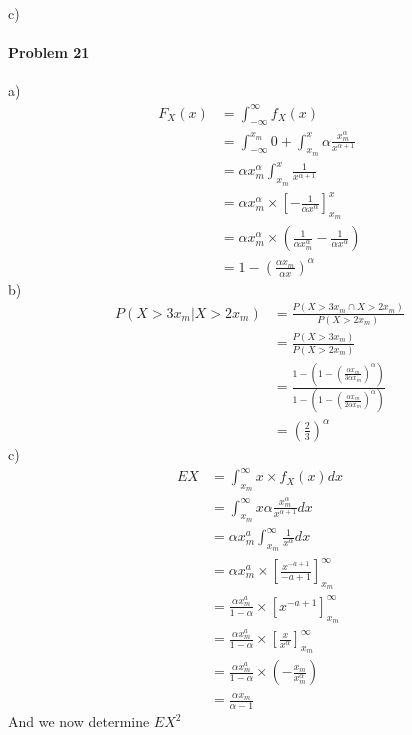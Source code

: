 c)
\paragraph{Problem 21}
a)
\begin{align*}
    F_{X}(x)&=\int_{-\infty}^{\infty}f_{X}(x) \\
         &=\int_{-\infty}^{x_{m}}0+\int_{x_{m}}^{x}\alpha\frac{x_{m}^{\alpha}}{x^{\alpha+1}} \\
         &=\alpha x_{m}^{\alpha}\int_{x_{m}}^{x}\frac{1}{x^{\alpha+1}} \\
         &=\alpha x_{m}^{\alpha}\times\left[-\frac{1}{\alpha x^{\alpha}}\right]_{x_{m}}^{x} \\
         &=\alpha x_{m}^{\alpha}\times\left(\frac{1}{\alpha x_{m}^{\alpha}}-\frac{1}{\alpha x^{\alpha}}\right) \\
         &=1-\left(\frac{\alpha x_{m}}{\alpha x}\right)^{\alpha}
\end{align*}
b)
\begin{align*}
    P(X>3x_{m}|X>2x_{m})&=\frac{P(X>3x_{m}\cap X>2x_{m})}{P(X>2x_{m})} \\
                        &=\frac{P(X>3x_{m})}{P(X>2x_{m})} \\
                        &=\frac{1-\left(1-\left(\frac{\alpha x_{m}}{3\alpha x_{m}}\right)^{\alpha}\right)}{1-\left(1-\left(\frac{\alpha x_{m}}{2\alpha x_{m}}\right)^{\alpha}\right)} \\
                        &=\left(\frac{2}{3}\right)^{\alpha}
\end{align*}
c)
\begin{align*}
    EX&=\int_{x_{m}}^{\infty}x\times f_{X}(x)dx \\
      &=\int_{x_{m}}^{\infty}x\alpha\frac{x_{m}^{\alpha}}{x^{\alpha+1}}dx \\
      &=\alpha x_{m}^{a}\int_{x_{m}}^{\infty}\frac{1}{x^{\alpha}}dx \\
      &=\alpha x_{m}^{a}\times\left[\frac{x^{-a+1}}{-a+1}\right]_{x_{m}}^{\infty} \\
      &=\frac{\alpha x_{m}^{a}}{1-\alpha}\times\left[x^{-a+1}\right]_{x_{m}}^{\infty} \\
      &=\frac{\alpha x_{m}^{a}}{1-\alpha}\times\left[\frac{x}{x^{\alpha}}\right]_{x_{m}}^{\infty} \\
      &=\frac{\alpha x_{m}^{a}}{1-\alpha}\times\left(-\frac{x_{m}}{x_{m}^{\alpha}}\right) \\
      &=\frac{\alpha x_{m}}{\alpha-1}
\end{align*}
And we now determine $EX^{2}$
